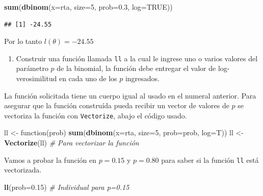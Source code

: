 \documentclass[10pt,]{krantz}
\makeatletter
\newenvironment{Shaded}{\begin{snugshade}}{\end{snugshade}}
\newcommand{\KeywordTok}[1]{\textcolor[rgb]{0.13,0.29,0.53}{\textbf{{#1}}}}
\newcommand{\DataTypeTok}[1]{\textcolor[rgb]{0.13,0.29,0.53}{{#1}}}
\newcommand{\DecValTok}[1]{\textcolor[rgb]{0.00,0.00,0.81}{{#1}}}
\newcommand{\FloatTok}[1]{\textcolor[rgb]{0.00,0.00,0.81}{{#1}}}
\newcommand{\StringTok}[1]{\textcolor[rgb]{0.31,0.60,0.02}{{#1}}}
\newcommand{\CommentTok}[1]{\textcolor[rgb]{0.56,0.35,0.01}{\textit{{#1}}}}
\newcommand{\OtherTok}[1]{\textcolor[rgb]{0.56,0.35,0.01}{{#1}}}
\newcommand{\NormalTok}[1]{{#1}}
\providecommand{\tightlist}{%
  \setlength{\itemsep}{0pt}\setlength{\parskip}{0pt}}
\newenvironment{kframe}{%
\medskip{}
\setlength{\fboxsep}{.8em}
 \def\at@end@of@kframe{}%
 \ifinner\ifhmode%
  \def\at@end@of@kframe{\end{minipage}}%
  \begin{minipage}{\columnwidth}%
 \fi\fi%
 \def\FrameCommand##1{\hskip\@totalleftmargin \hskip-\fboxsep
 \colorbox{shadecolor}{##1}\hskip-\fboxsep
     \hskip-\linewidth \hskip-\@totalleftmargin \hskip\columnwidth}%
 \MakeFramed {\advance\hsize-\width
   \@totalleftmargin\z@ \linewidth\hsize
   \@setminipage}}%
 {\par\unskip\endMakeFramed%
 \at@end@of@kframe}
\renewenvironment{Shaded}{\begin{kframe}}{\end{kframe}}
\makeatother
\begin{document}
\begin{Shaded}
\begin{Highlighting}[]
\KeywordTok{sum}\NormalTok{(}\KeywordTok{dbinom}\NormalTok{(}\DataTypeTok{x=}\NormalTok{rta, }\DataTypeTok{size=}\DecValTok{5}\NormalTok{, }\DataTypeTok{prob=}\FloatTok{0.3}\NormalTok{, }\DataTypeTok{log=}\OtherTok{TRUE}\NormalTok{))}
\end{Highlighting}
\end{Shaded}

\begin{verbatim}
## [1] -24.55
\end{verbatim}

Por lo tanto \(l(\theta)= -24.55\)

\begin{enumerate}
\def\labelenumi{\arabic{enumi})}
\setcounter{enumi}{1}
\tightlist
\item
  Construir una función llamada \texttt{ll} a la cual le ingrese uno o
  varios valores del parámetro \(p\) de la binomial, la función debe
  entregar el valor de log-verosimilitud en cada uno de los \(p\)
  ingresados.
\end{enumerate}

La función solicitada tiene un cuerpo igual al usado en el numeral
anterior. Para asegurar que la función construída pueda recibir un
vector de valores de \(p\) se vectoriza la función con
\texttt{Vectorize}, abajo el código usado.

\begin{Shaded}
\begin{Highlighting}[]
\NormalTok{ll <-}\StringTok{ }\NormalTok{function(prob) }\KeywordTok{sum}\NormalTok{(}\KeywordTok{dbinom}\NormalTok{(}\DataTypeTok{x=}\NormalTok{rta, }\DataTypeTok{size=}\DecValTok{5}\NormalTok{, }\DataTypeTok{prob=}\NormalTok{prob, }\DataTypeTok{log=}\NormalTok{T))}
\NormalTok{ll <-}\StringTok{ }\KeywordTok{Vectorize}\NormalTok{(ll)  }\CommentTok{# Para vectorizar la función}
\end{Highlighting}
\end{Shaded}

Vamos a probar la función en \(p=0.15\) y \(p=0.80\) para saber si la
función \texttt{ll} está vectorizada.

\begin{Shaded}
\begin{Highlighting}[]
\KeywordTok{ll}\NormalTok{(}\DataTypeTok{prob=}\FloatTok{0.15}\NormalTok{)  }\CommentTok{# Individual para p=0.15}
\end{Highlighting}
\end{Shaded}
\end{document}
